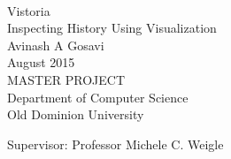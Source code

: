 
\thispagestyle{empty}
\mbox{}\\[6pc]
\begin{center}
\Huge{Vistoria\\ Inspecting History Using Visualization}\\[2pc]

\Large{Avinash A Gosavi}\\[1pc]
\large{August 2015}\\[2pc]

MASTER PROJECT\\
Department of Computer Science\\
Old Dominion University
\end{center}
\vfill

\noindent Supervisor: Professor Michele C. Weigle

